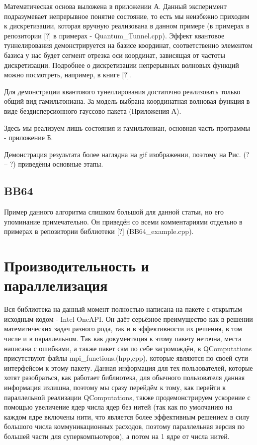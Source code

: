 \documentclass[aps,twocolumn,pra,showpacs,amsmath,amssymb,showkeys,10pt]{revtex4-2}
\begin{document}
    Математическая основа выложена в приложении А. Данный эксперимент подразумевает непрерывное понятие состояние, то есть мы неизбежно приходим к дискретизации, которая 
    вручную реализована в данном примере (в примерах в репозитории [?] в примерах - Quantum_Tunnel.cpp). Эффект 
    квантовое туннелирования демонстрируется на базисе координат, соответственно элементом базиса у нас будет сегмент отрезка оси координат, зависящая от частоты дискретизации. 
    Подробнее о дискретизации непрерывных волновых функций можно посмотреть, 
    например, в книге [?].

    Для демонстрации квантового тунеллирования достаточно реализовать только общий вид гамильтониана. За модель выбрана координатная волновая функция в виде бездисперсионного гауссово пакета (Приложения А).

    Здесь мы реализуем лишь состояния и гамильтониан, основная часть программы - приложение Б.

    Демонстрация результата более наглядна на gif изображении, поэтому на Рис. (? -- ?) приведёны основные этапы.

    \subsection{BB64}
    Пример данного алгоритма слишком большой для данной статьи, но его упоминание примечательно. Он приведён со всеми комментариями отдельно в примерах в репозитории библиотеки [?] (BB64\_example.cpp).

    \section{Производительность и параллелизация}
    Вся библиотека на данный момент полностью написана на пакете с открытым исходным кодом - Intel OneAPI. Он даёт серьёзное преимущество как в решении математических задач разного рода, так и в 
    эффективности их решения, в том числе и в параллельном. Так как документация к этому пакету неточна, места написана с ошибками, а также пакет сам по себе загромождён, в QComputations присутствуют 
    файлы mpi\_functions.(hpp,cpp), которые являются по своей сути интерфейсом к этому пакету. Данная информация для тех пользователей, которые хотят разобраться, как работает библиотека, для 
    обычного пользователя данная информация излишна, поэтому мы сразу перейдём к тому, как перейти к параллельной реализации QComputations, также продемонстрируем ускорение с помощью увеличение ядер 
    числа ядер без нитей (так как по умолчанию на каждом ядре включены нити, что является более эффективным решением в силу большого числа коммуникационных расходов, поэтому параллельная версия по большей 
    части для суперкомпьютеров), а потом на 1 ядре от числа нитей.
\end{document}
